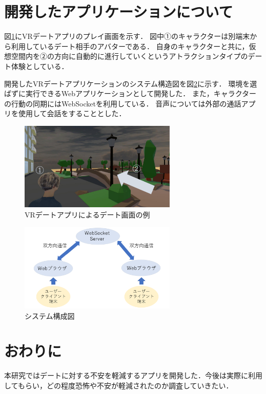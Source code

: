 \documentclass[twocolumn,10pt,a4j]{ltjsarticle}
\begin{document}
\section{開発したアプリケーションについて}
図\ref{fig:screen}にVRデートアプリのプレイ画面を示す．
図中①のキャラクターは別端末から利用しているデート相手のアバターである．
自身のキャラクターと共に，仮想空間内を②の方向に自動的に進行していくというアトラクションタイプのデート体験としている．

開発したVRデートアプリケーションのシステム構造図を図\ref{fig:system}に示す．
環境を選ばずに実行できるWebアプリケーションとして開発した．
また，キャラクターの行動の同期にはWebSocketを利用している．
音声については外部の通話アプリを使用して会話をすることとした．


\begin{figure}[h]
\begin{center}
\includegraphics[width=75mm]{apurinai.pdf}
\end{center}
 \caption{VRデートアプリによるデート画面の例}
 \label{fig:screen}
\end{figure}

\begin{figure}[h]
\begin{center}
\includegraphics[width=75mm]{systemkouzou.pdf}
\end{center}
 \caption{システム構成図}
 \label{fig:system}
\end{figure}

\section{おわりに}
本研究ではデートに対する不安を軽減するアプリを開発した．今後は実際に利用してもらい，どの程度恐怖や不安が軽減されたのか調査していきたい．
\end{document}
